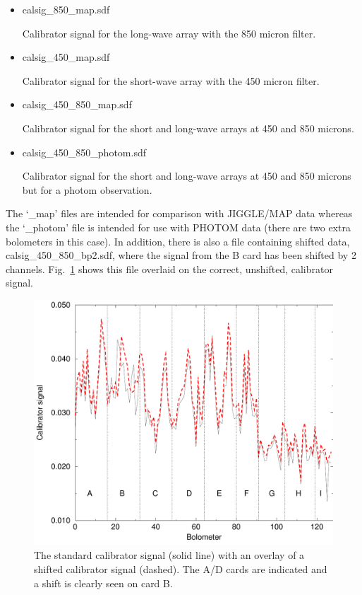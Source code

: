 \documentclass[twoside,11pt]{starlink}
\begin{document}
\begin{itemize}
\item calsig\_850\_map.sdf

Calibrator signal for the long-wave array with the 850 micron filter.

\item calsig\_450\_map.sdf

Calibrator signal for the short-wave array with the 450 micron filter.

\item calsig\_450\_850\_map.sdf

Calibrator signal for the short and long-wave arrays at 450 and 850 microns.

\item calsig\_450\_850\_photom.sdf

Calibrator signal for the short and long-wave arrays at 450 and 850 microns
but for a photom observation.

\end{itemize}

The `\_map' files are intended for comparison with JIGGLE/MAP data whereas the
`\_photom' file is intended for use with PHOTOM data (there are two extra
bolometers in this case).  In addition, there is also a file containing
shifted data, calsig\_450\_850\_bp2.sdf, where the signal from the B card has
been shifted by 2 channels. Fig.\ \ref{scushift_fig} shows this file overlaid
on the correct, unshifted, calibrator signal.

\begin{figure}
\begin{center}
\includegraphics[width=5in]{sun216_shift_diag}
\caption{The standard calibrator signal (solid line) with an overlay of a
shifted calibrator signal (dashed). The A/D cards are indicated and a shift
is clearly seen on card B.}
\label{scushift_fig}
\end{center}
\end{figure}
\end{document}
